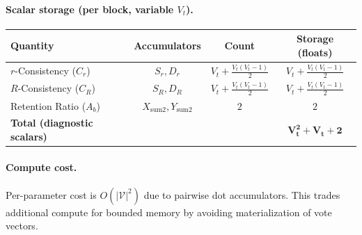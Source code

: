 \documentclass{article}
\begin{document}
\paragraph{Scalar storage (per block, variable $V_t$).}
\begin{center}
\begin{tabular}{lccc}
\toprule
Quantity & Accumulators & Count & Storage (floats) \\
\midrule
$r$-Consistency ($C_r$) & $S_r, D_r$ & $V_t + \tfrac{V_t(V_t-1)}{2}$ & $V_t + \tfrac{V_t(V_t-1)}{2}$ \\
$R$-Consistency ($C_R$) & $S_R, D_R$ & $V_t + \tfrac{V_t(V_t-1)}{2}$ & $V_t + \tfrac{V_t(V_t-1)}{2}$ \\
Retention Ratio ($A_b$) & $X_{\mathrm{sum2}}, Y_{\mathrm{sum2}}$ & $2$ & $2$ \\
\midrule
\textbf{Total (diagnostic scalars)} & & & $\mathbf{V_t^2 + V_t + 2}$ \\
\bottomrule
\end{tabular}
\end{center}

\paragraph{Compute cost.}
Per-parameter cost is $O(|\mathcal V|^2)$ due to pairwise dot accumulators.
This trades additional compute for bounded memory by avoiding
materialization of vote vectors.



\end{document}
